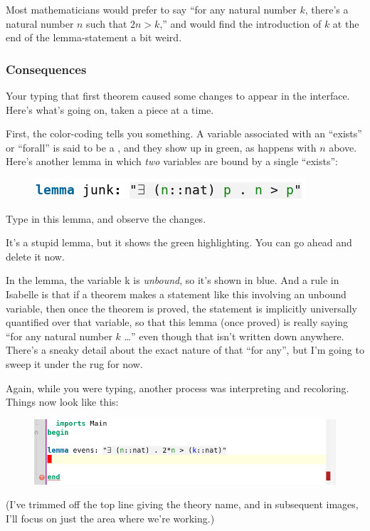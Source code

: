 Most mathematicians would prefer to say ``for any natural number $k$, there's a natural number $n$ such that $2n > k$,'' and would find the introduction of $k$ at the end of the lemma-statement a bit weird. 

\subsubsection{Consequences}
Your typing that first theorem caused some changes to appear in the interface. Here's what's going on, taken a piece at a time.

First, the color-coding tells you something. A variable associated with an ``exists'' or ``forall'' is said to be a , and they show up in green, as happens with $n$ above. Here's another lemma in which \textit{two} variables are bound by a single ``exists'':
\begin{figure}[h]
    \includegraphics[width=0.5\linewidth]{TEXT/C01/Images/junk-lemma.png}
\end{figure}

\task
Type in this lemma, and observe the changes. 

It's a stupid lemma, but it shows the green highlighting. You can go ahead and delete it now. 
\etask

In the  lemma, the variable k is \textit{unbound}, so it's shown in blue. And a rule in Isabelle is that if a theorem makes a statement like this involving an unbound variable, then once the theorem is proved, the statement is implicitly universally quantified over that variable, so that this lemma (once proved) is really saying ``for any natural number $k$ \ldots'' even though that isn't written down anywhere. There's a sneaky detail about the exact nature of that ``for any'', but I'm going to sweep it under the rug for now. 

Again, while you were typing, another process was interpreting and recoloring. Things now look like this:
\begin{figure}[ht]
    \includegraphics[width=0.75\linewidth]{TEXT/C01/Images/unproved-lemma.png}
\end{figure}
\newpage
(I've trimmed off the top line giving the theory name, and in subsequent images, I'll focus on just the area where we're working.)

